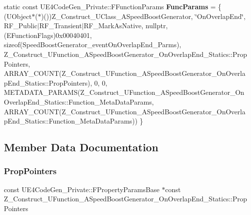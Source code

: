 \begin{DoxyCompactItemize}
static const U\+E4\+Code\+Gen\+\_\+\+Private\+::\+F\+Function\+Params {\bfseries Func\+Params} = \{ (U\+Object$\ast$($\ast$)())Z\+\_\+\+Construct\+\_\+\+U\+Class\+\_\+\+A\+Speed\+Boost\+Generator, \char`\"{}On\+Overlap\+End\char`\"{}, R\+F\+\_\+\+Public$\vert$R\+F\+\_\+\+Transient$\vert$R\+F\+\_\+\+Mark\+As\+Native, nullptr, (E\+Function\+Flags)0x00040401, sizeof(\+Speed\+Boost\+Generator\+\_\+event\+On\+Overlap\+End\+\_\+\+Parms), Z\+\_\+\+Construct\+\_\+\+U\+Function\+\_\+\+A\+Speed\+Boost\+Generator\+\_\+\+On\+Overlap\+End\+\_\+\+Statics\+::\+Prop\+Pointers, A\+R\+R\+A\+Y\+\_\+\+C\+O\+U\+N\+T(\+Z\+\_\+\+Construct\+\_\+\+U\+Function\+\_\+\+A\+Speed\+Boost\+Generator\+\_\+\+On\+Overlap\+End\+\_\+\+Statics\+::\+Prop\+Pointers), 0, 0, M\+E\+T\+A\+D\+A\+T\+A\+\_\+\+P\+A\+R\+A\+M\+S(\+Z\+\_\+\+Construct\+\_\+\+U\+Function\+\_\+\+A\+Speed\+Boost\+Generator\+\_\+\+On\+Overlap\+End\+\_\+\+Statics\+::\+Function\+\_\+\+Meta\+Data\+Params, A\+R\+R\+A\+Y\+\_\+\+C\+O\+U\+N\+T(\+Z\+\_\+\+Construct\+\_\+\+U\+Function\+\_\+\+A\+Speed\+Boost\+Generator\+\_\+\+On\+Overlap\+End\+\_\+\+Statics\+::\+Function\+\_\+\+Meta\+Data\+Params)) \}
\end{DoxyCompactItemize}


\subsection{Member Data Documentation}
\mbox{\label{struct_z___construct___u_function___a_speed_boost_generator___on_overlap_end___statics_a75819764f1c8587438cc0d61206eb34f}} 
\subsubsection{\texorpdfstring{PropPointers}{PropPointers}}
{\footnotesize\ttfamily const U\+E4\+Code\+Gen\+\_\+\+Private\+::\+F\+Property\+Params\+Base $\ast$const Z\+\_\+\+Construct\+\_\+\+U\+Function\+\_\+\+A\+Speed\+Boost\+Generator\+\_\+\+On\+Overlap\+End\+\_\+\+Statics\+::\+Prop\+Pointers\hspace{0.3cm}{\ttfamily [static]}}


